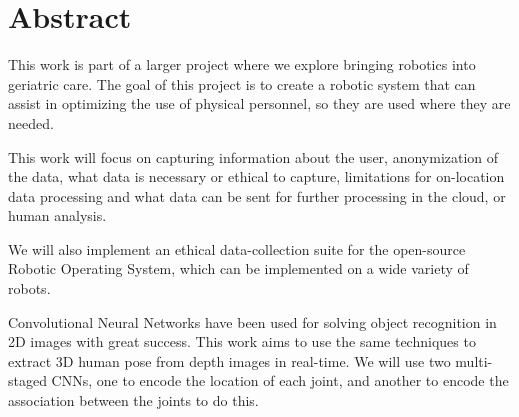 \chapter*{Abstract}


This work is part of a larger project where we explore bringing robotics into geriatric care. The goal of this project is to create a robotic system that can assist in optimizing the use of physical personnel, so they are used where they are needed.

This work will focus on capturing information about the user, anonymization of the data, what data is necessary or ethical to capture, limitations for on-location data processing and what data can be sent for further processing in the cloud, or human analysis.

We will also implement an ethical data-collection suite for the open-source Robotic Operating System, which can be implemented on a wide variety of robots.

Convolutional Neural Networks have been used for solving object recognition in 2D images with great success. This work aims to use the same techniques to extract 3D human pose from depth images in real-time. We will use two multi-staged CNNs, one to encode the location of each joint, and another to encode the association between the joints to do this.





